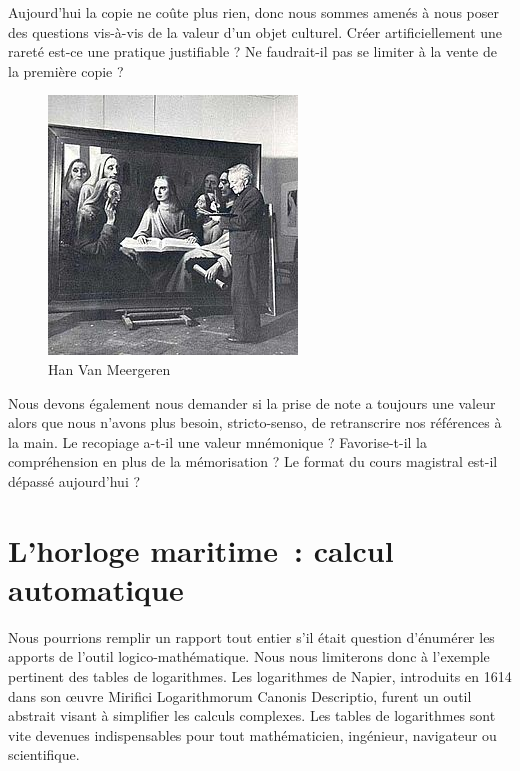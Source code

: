\begin{minipage}[H]{0.44\linewidth}
Aujourd'hui la copie ne coûte plus rien, donc nous sommes amenés à nous poser des questions vis-à-vis de la valeur d'un objet culturel. Créer artificiellement une rareté est-ce une pratique justifiable ? Ne faudrait-il pas se limiter à la vente de la première copie ?
\vspace{1cm}
\end{minipage}
\begin{minipage}[H]{0.54\linewidth}
  \begin{figure}[H]
  \centering
  \includegraphics[height=0.15\paperheight]{../resources/illustrations/meergeren}
  \caption{Han Van Meergeren}
  \end{figure}
\end{minipage}

Nous devons également nous demander si la prise de note a toujours une valeur alors que nous n'avons plus besoin, stricto-senso, de retranscrire nos références à la main. Le recopiage a-t-il une valeur mnémonique ? Favorise-t-il la compréhension en plus de la mémorisation ? Le format du cours magistral est-il dépassé aujourd'hui ?

\chapter{L'horloge maritime~: calcul automatique}
Nous pourrions remplir un rapport tout entier s'il était question d'énumérer les apports de l'outil logico-mathématique. Nous nous limiterons donc à l'exemple pertinent des tables de logarithmes. Les logarithmes de Napier, introduits en 1614 dans son \oe{}uvre \og{}Mirifici Logarithmorum Canonis Descriptio\fg{}, furent un outil abstrait visant à simplifier les calculs complexes. Les tables de logarithmes sont vite devenues indispensables pour tout mathématicien, ingénieur, navigateur ou scientifique.

